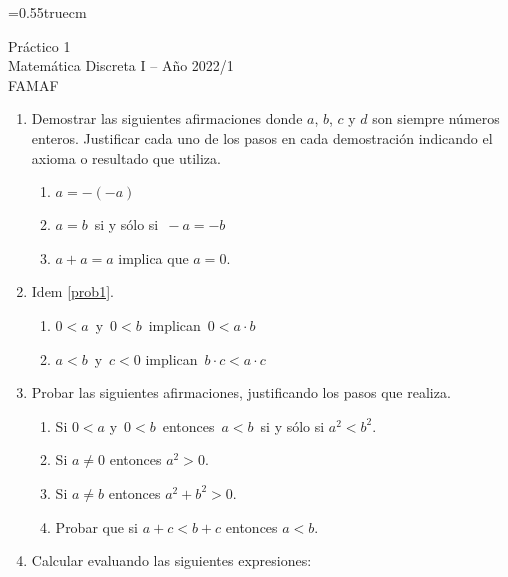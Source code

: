\documentclass[a4paper,12pt,twoside,spanish,reqno]{amsbook}
\numberwithin{equation}{section}
\begin{document}
    \baselineskip=0.55truecm %
    

{\bf \begin{center}\large  Práctico 1 \\ Matemática Discreta I -- Año 2022/1 \\ FAMAF \end{center}}


\begin{enumerate}

\item\label{prob1} Demostrar las siguientes afirmaciones donde $a$, $b$, $c$ y $d$ son siempre números enteros. Justificar cada uno de los pasos en cada demostración indicando el axioma o resultado que utiliza.
    \begin{enumerate}
        \item  $a=-(-a)$
        \item  $a=b\,$ si y sólo si $\,-a=-b$
        \item  $a+a=a$ implica que  $a=0$.
    \end{enumerate}




\item Idem \ref{prob1}.
    \begin{enumerate}
        \item $0<a\,$ y $\,0<b\,$ implican $\,0<a\cdot b$
        \item $a<b\,$ y $\,c<0$ implican $\,b\cdot c<a\cdot c$
    \end{enumerate}



\item  Probar las siguientes afirmaciones, justificando los pasos que realiza.
    \begin{enumerate}
        \item Si $0 < a$  y $\,0<b\,$ entonces $\,a<b\,$ si y sólo si $a^2<b^2$.
        \item Si $a\neq 0$  entonces $a^2>0$.
        \item Si $a\neq b$  entonces $a^2+b^2>0$.
        \item Probar que si $a+c <b+c$ entonces $a<b$.
    \end{enumerate}





\item Calcular evaluando las siguientes expresiones:
\end{enumerate}
\end{document}
